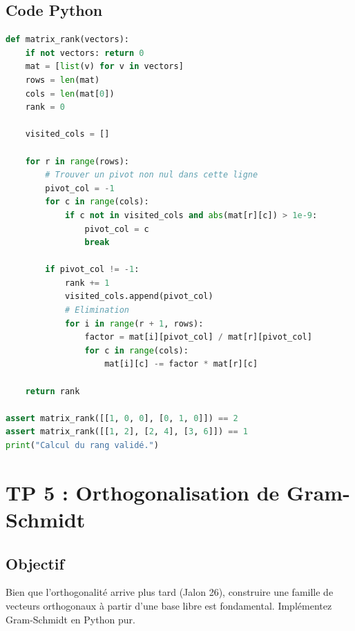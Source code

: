 \documentclass{report}
\begin{document}
\section*{Code Python}
\begin{lstlisting}[language=Python]
def matrix_rank(vectors):
    if not vectors: return 0
    mat = [list(v) for v in vectors]
    rows = len(mat)
    cols = len(mat[0])
    rank = 0

    visited_cols = []

    for r in range(rows):
        # Trouver un pivot non nul dans cette ligne
        pivot_col = -1
        for c in range(cols):
            if c not in visited_cols and abs(mat[r][c]) > 1e-9:
                pivot_col = c
                break

        if pivot_col != -1:
            rank += 1
            visited_cols.append(pivot_col)
            # Elimination
            for i in range(r + 1, rows):
                factor = mat[i][pivot_col] / mat[r][pivot_col]
                for c in range(cols):
                    mat[i][c] -= factor * mat[r][c]

    return rank

assert matrix_rank([[1, 0, 0], [0, 1, 0]]) == 2
assert matrix_rank([[1, 2], [2, 4], [3, 6]]) == 1
print("Calcul du rang validé.")
\end{lstlisting}

\newpage


\chapter*{TP 5 : Orthogonalisation de Gram-Schmidt}

\section*{Objectif}
Bien que l'orthogonalité arrive plus tard (Jalon 26), construire une famille de vecteurs orthogonaux à partir d'une base libre est fondamental. Implémentez Gram-Schmidt en Python pur.
\end{document}
